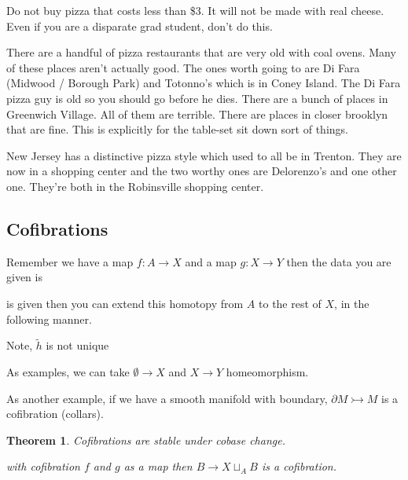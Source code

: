 \documentclass[12pt]{article}
\newtheorem{theorem}{Theorem}[section]
\theoremstyle{definition}
\begin{document}
	Do not buy pizza that costs less than \$3. It will not be made with real cheese. Even if you are a disparate grad student, don't do this.
	
	There are a handful of pizza restaurants that are very old with coal ovens. Many of these places aren't actually good. The ones worth going to are Di Fara (Midwood / Borough Park) and Totonno's which is in Coney Island. The Di Fara pizza guy is old so you should go before he dies. There are a bunch of places in Greenwich Village. All of them are terrible. There are places in closer brooklyn that are fine. This is explicitly for the table-set sit down sort of things. 
	
	New Jersey has a distinctive pizza style which used to all be in Trenton. They are now in a shopping center and the two worthy ones are Delorenzo's and one other one. They're both in the Robinsville shopping center. 
	
	
	\subsection{Cofibrations}
	Remember we have a map $f:A \to X$ and a map $g:X\to Y$ then the data you are given is 
	\begin{center}
	\end{center}
	is given then you can extend this homotopy from $A$ to the rest of $X$,  in the following manner.
	\begin{center}
\end{center}
	Note, $\tilde h$ is not unique
	
	As examples, we can take $\emptyset \to X$ and $X\to Y$ homeomorphism. 
	
	As another example, if we have a smooth manifold with boundary, $\partial M\rightarrowtail M$ is a cofibration (collars). 
	\begin{theorem}
		Cofibrations are stable under cobase change.
		with cofibration $f$ and $g$ as a map then $B\to X\sqcup_A B$ is a cofibration. 
	\end{theorem}
	
\end{document}
